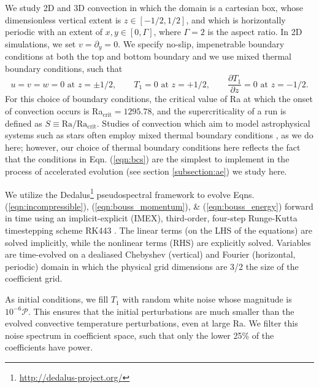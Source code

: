 \documentclass[aps, pre, onecolumn, nofootinbib, notitlepage, groupedaddress, amsfonts, amssymb, amsmath, longbibliography]{revtex4-1}
\begin{document}
We study 2D and 3D convection in which the domain is a cartesian box, 
whose dimensionless vertical extent is $z \in [-1/2, 1/2]$, 
and which is horizontally periodic with an extent of $x, y \in [0, \Gamma]$,
where $\Gamma = 2$ is the aspect ratio. 
In 2D simulations, we set $v = \partial_y = 0$.
We specify no-slip, impenetrable boundary conditions at both the top and
bottom boundary and we use mixed thermal boundary conditions, such that
\begin{equation}
u = v = w = 0 \, \, \text{at}\,\,z = \pm 1/2, \qquad T_1 = 0 \,\,\text{at}\,\, z=+1/2, \qquad
\frac{\partial T_1}{\partial z} = 0\,\,\text{at}\,\,z=-1/2.
\label{eqn:bcs}
\end{equation}
For this choice of boundary conditions, the critical value of Ra at which
the onset of convection occurs is Ra$_{\text{crit}} = 1295.78$, and the
supercriticality of a run is defined as $S \equiv \text{Ra}/\text{Ra}_{\text{crit}}$.
Studies of convection which aim to model
astrophysical systems such as stars often employ mixed thermal
boundary conditions \cite{hurlburt&all1984, cattaneo&all1991, korre&all2017},
as we do here; however, our choice of thermal boundary conditions here
reflects the fact that the conditions in Eqn. (\ref{eqn:bcs}) are the simplest
to implement in the process of accelerated evolution (see section \ref{subsection:ae})
we study here.

We utilize the 
Dedalus\footnote{\url{http://dedalus-project.org/}} 
pseudospectral framework \cite{burns&all2016} to evolve  
Eqns. (\ref{eqn:incompressible}), (\ref{eqn:bouss_momentum}), \& (\ref{eqn:bouss_energy}) 
forward in time
using an implicit-explicit (IMEX), third-order, four-step 
Runge-Kutta timestepping scheme RK443 \cite{ascher&all1997}.  
The linear terms (on the LHS of the equations) are solved implicitly,
while the nonlinear terms (RHS) are explicitly solved.
Variables are time-evolved on a dealiased Chebyshev (vertical)
and Fourier (horizontal, periodic) domain in which the
physical grid dimensions are 3/2 the size of the coefficient grid.  

As initial conditions, we fill $T_1$ with
random white noise whose magnitude is $10^{-6}\mathcal{P}$.
This ensures that the initial perturbations are much smaller than the
evolved convective temperature perturbations, even at large Ra.
We filter this noise spectrum in coefficient space, 
such that only the lower 25\% of the coefficients
have power.


\end{document}
